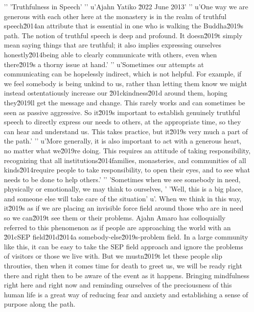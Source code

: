 '\n'
'Truthfulness in Speech'
'\n'
u'Ajahn Yatiko \u2022 June 2013'
'\n'
u'One way we are generous with each other here at the monastery is in the realm of truthful speech\u2014an attribute that is essential in one who is walking the Buddha\u2019s path. The notion of truthful speech is deep and profound. It doesn\u2019t simply mean saying things that are truthful; it also implies expressing ourselves honestly\u2014being able to clearly communicate with others, even when there\u2019s a thorny issue at hand.'
'\n'
u'Sometimes our attempts at communicating can be hopelessly indirect, which is not helpful. For example, if we feel somebody is being unkind to us, rather than letting them know we might instead ostentatiously increase our \u201ckindness\u201d around them, hoping they\u2019ll get the message and change. This rarely works and can sometimes be seen as passive aggressive. So it\u2019s important to establish genuinely truthful speech to directly express our needs to others, at the appropriate time, so they can hear and understand us. This takes practice, but it\u2019s very much a part of the path.'
'\n'
u'More generally, it is also important to act with a generous heart, no matter what we\u2019re doing. This requires an attitude of taking responsibility, recognizing that all institutions\u2014families, monasteries, and communities of all kinds\u2014require people to take responsibility, to open their eyes, and to see what needs to be done to help others.'
'\n'
'Sometimes when we see somebody in need, physically or emotionally, we may think to ourselves, '
'Well, this is a big place, and someone else will take care of the situation'
u'. When we think in this way, it\u2019s as if we are placing an invisible force field around those who are in need so we can\u2019t see them or their problems. Ajahn Amaro has colloquially referred to this phenomenon as if people are approaching the world with an \u201cSEP field\u201d\u2014a somebody-else\u2019s-problem field. In a large community like this, it can be easy to take the SEP field approach and ignore the problems of visitors or those we live with. But we mustn\u2019t let these people slip throuties, then when it 
comes time for death to greet us, we will be ready right there and 
right then to be aware of the event as it happens. Bringing mindfulness 
right here and right now and reminding ourselves of the preciousness of 
this human life is a great way of reducing fear and anxiety and 
establishing a sense of purpose along the path.


